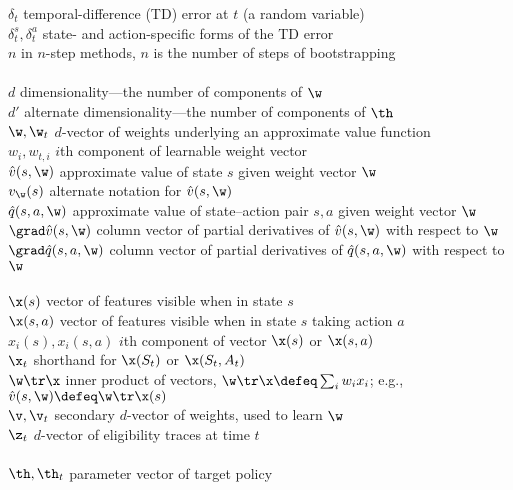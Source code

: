 \begin{tabbing}
\>$\delta_t$          \> temporal-difference (TD) error at $t$ (a random variable) \\
\>$\delta^s_t, \delta^a_t$ \> state- and action-specific forms of the TD error \\
\>$n$                 \> in $n$-step methods, $n$ is the number of steps of bootstrapping\\
\\
\>$d$                 \> dimensionality---the number of components of $\w$\\
\>$d'$                \> alternate dimensionality---the number of components of $\th$\\
\>$\w,\w_t$           \> $d$-vector of weights underlying an approximate value function\\
\>$w_i,w_{t,i}$ \> $i$th component of learnable weight vector\\
\>$\hat v(s,\w)$      \> approximate value of state $s$ given weight vector $\w$\\
\>$v_\w(s)$           \> alternate notation for $\hat v(s,\w)$\\
\>$\hat q(s,a,\w)$    \> approximate value of state--action pair $s,a$ given weight vector $\w$\\
\>$\grad \hat v(s,\w)$\> column vector of partial derivatives of $\hat v(s,\w)$ with respect to $\w$\\
\>$\grad \hat q(s,a,\w)$\> column vector of partial derivatives of $\hat q(s,a,\w)$ with respect to $\w$\\
\\
\>$\x(s)$             \> vector of features visible when in state $s$\\
\>$\x(s,a)$           \> vector of features visible when in state $s$ taking action $a$\\
\>$x_i(s), x_i(s,a)$  \> $i$th component of vector $\x(s)$ or $\x(s, a)$\\
\>$\x_t$              \> shorthand for $\x(S_t)$ or $\x(S_t,A_t)$\\
\>$\w\tr\x$           \> inner product of vectors, $\w\tr\x\defeq\sum_i w_i x_i$; e.g., $\hat v(s,\w)\defeq\w\tr\x(s)$\\
\>$\v,\v_t$           \> secondary $d$-vector of weights, used to learn $\w$ \\
\>$\z_t$              \> $d$-vector of eligibility traces at time $t$ \\
\\
\>$\th, \th_t$        \> parameter vector of target policy \\

\end{tabbing}
